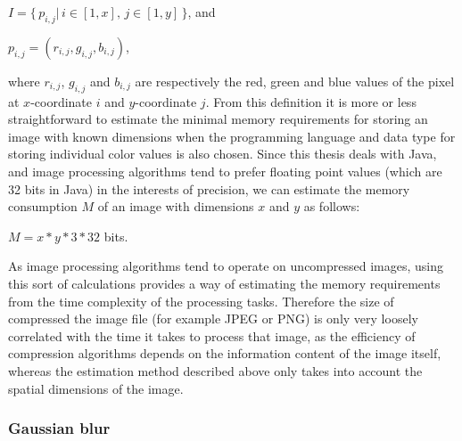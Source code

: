 \documentclass [12pt,a4paper]{report}
\begin{document}
\begin{center}
$I = \{ \, p_{i,j} | \, i \in [1,x], \, j \in [1,y] \, \}$, and

$p_{i,j} = (r_{i,j}, g_{i,j}, b_{i,j})$,
\end{center}
where $r_{i,j}$, $g_{i,j}$ and $b_{i,j}$ are respectively the red, green and blue values of the pixel at $x$-coordinate $i$ and $y$-coordinate $j$. From this definition it is more or less straightforward to estimate the minimal memory requirements for storing an image with known dimensions when the programming language and data type for storing individual color values is also chosen. Since this thesis deals with Java, and image processing algorithms tend to prefer floating point values (which are 32 bits in Java) in the interests of precision, we can estimate the memory consumption $M$ of an image with dimensions $x$ and $y$ as follows:

\begin{center} 
$M = x * y * 3 * 32$ bits.
\end{center}

As image processing algorithms tend to operate on uncompressed images, using this sort of calculations provides a way of estimating the memory requirements from the time complexity of the processing tasks. Therefore the size of compressed the image file (for example JPEG or PNG) is only very loosely correlated with the time it takes to process that image, as the efficiency of compression algorithms depends on the information content of the image itself, whereas the estimation method described above only takes into account the spatial dimensions of the image.

\subsubsection{Gaussian blur}
\end{document}
